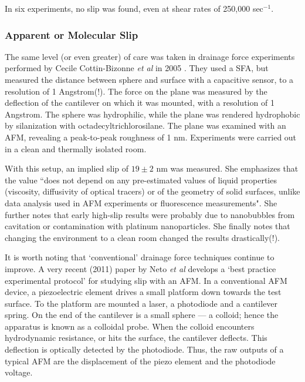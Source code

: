 \documentclass[12pt, a4paper, twoside, openright]{book}
\begin{document}
In six experiments, no slip was found, even at shear rates of 250,000 sec$^{-1}$. 

\subsubsection{Apparent or Molecular Slip}

The same level (or even greater) of care was taken in drainage force experiments performed by Cecile Cottin-Bizonne \emph{et al} in 2005 \cite{Cottin-Bizonne2005}. They used a SFA, but measured the distance between sphere and surface with a capacitive sensor, to a resolution of 1 Angstrom(!). The force on the plane was measured by the deflection of the cantilever on which it was mounted, with a resolution of 1 Angstrom.  The sphere was hydrophilic, while the plane was rendered hydrophobic by silanization with octadecyltrichlorosilane. The plane was examined with an AFM, revealing a peak-to-peak roughness of 1 nm.  Experiments were carried out in a clean and thermally isolated room.

With this setup, an implied slip of $19 \pm 2$ nm was measured. She emphasizes that the value ``does not depend on any pre-estimated values of liquid properties (viscosity, diffusivity of optical tracers) or of the geometry of solid surfaces, unlike data analysis used in AFM experiments or fluorescence measurements".  She further notes that early high-slip results were probably due to nanobubbles from cavitation or contamination with platinum nanoparticles. She finally notes that changing the environment to a clean room changed the results drastically(!).

\vspace{1em}
It is worth noting that `conventional' drainage force techniques continue to improve.  A very recent (2011) paper by Neto \emph{et al} \cite{ZhuAttardNeto2011} develops a `best practice experimental protocol' for studying slip with an AFM.  In a conventional AFM device, a piezoelectric element drives a small platform down towards the test surface.  To the platform are mounted a laser, a photodiode and a cantilever spring.  On the end of the cantilever is a small sphere --- a colloid; hence the apparatus is known as a colloidal probe.  When the colloid encounters hydrodynamic resistance, or hits the surface, the cantilever deflects.  This deflection is optically detected by the photodiode. Thus, the raw outputs of a typical AFM are the displacement of the piezo element and the photodiode voltage.
\end{document}

